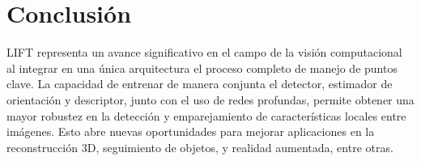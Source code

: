 \documentclass{article}
\begin{document}
\section{Conclusión}

LIFT representa un avance significativo en el campo de la visión computacional al integrar en una única arquitectura el proceso completo de manejo de puntos clave. La capacidad de entrenar de manera conjunta el detector, estimador de orientación y descriptor, junto con el uso de redes profundas, permite obtener una mayor robustez en la detección y emparejamiento de características locales entre imágenes. Esto abre nuevas oportunidades para mejorar aplicaciones en la reconstrucción 3D, seguimiento de objetos, y realidad aumentada, entre otras.



\end{document}
